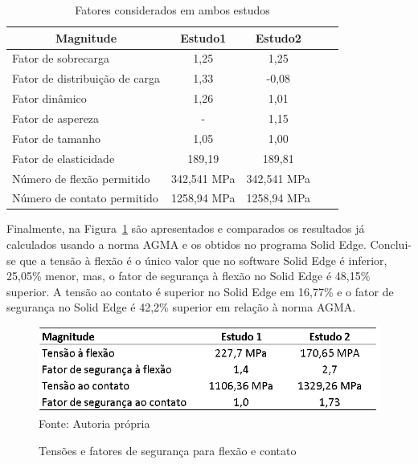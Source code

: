 \documentclass[12pt,a4paper]{article}
\begin{document}
\begin{table}[!htb]
\centering
\caption{{\label{tab:9} Fatores considerados em ambos estudos}}
\begin{tabular}{l c c c c}
\hline
\multicolumn{1}{c}{\textbf{Magnitude}} & \textbf{Estudo1} & \textbf{Estudo2} \\ \hline
Fator de sobrecarga                 & 1,25              & 1,25 \\
Fator de distribuição de carga      & 1,33              & -0,08 \\
Fator dinâmico                      & 1,26              & 1,01  \\
Fator de aspereza                      & -                 & 1,15              \\
Fator de tamanho                       & 1,05              & 1,00              \\
Fator de elasticidade                  & 189,19            & 189,81            \\
Número de flexão permitido             & 342,541 MPa       & 342,541 MPa       \\
Número de contato permitido            & 1258,94 MPa       & 1258,94 MPa   \\ \hline  
\end{tabular}
\end{table}

Finalmente, na Figura~{\ref{fig:35}} são apresentados e
comparados os resultados já calculados usando a norma AGMA e os obtidos
no programa Solid Edge. Conclui-se que a tensão à flexão é o único valor
que no software Solid Edge é inferior, 25,05\% menor, mas, o fator de
segurança à flexão no Solid Edge é 48,15\% superior. A tensão ao contato
é superior no Solid Edge em 16,77\% e o fator de segurança no Solid Edge
é 42,2\% superior em relação à norma AGMA.

\begin{figure}[!htb]
    \centering
    \caption{Tensões e fatores de segurança para flexão e contato}
    \includegraphics[scale=0.65]{Imagens/Img35.png}\\
    {\footnotesize Fonte: Autoria própria}
    \label{fig:35}
\end{figure}
\end{document}
